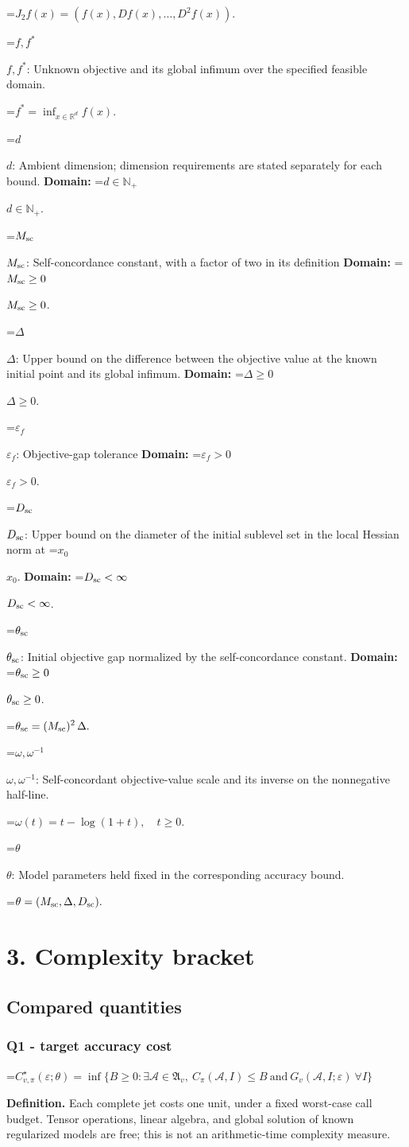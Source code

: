 \documentclass[10pt,a4paper]{article}
\newcommand{\AtlasMath}[1]{\par\begingroup\centering\setbox0=\hbox{$\displaystyle #1$}\ifdim\wd0>1.4\linewidth\typeout{ATLAS WIDE FORMULA: \the\wd0}\fi\ifdim\wd0>\linewidth\resizebox{\linewidth}{!}{\box0}\else\box0\fi\par\endgroup}
\newcommand{\AtlasInlineMath}[1]{\begingroup\setbox0=\hbox{$#1$}\ifdim\wd0>.4\linewidth\endgroup\AtlasMath{#1}\else\endgroup$#1$\fi}
\begin{document}
\AtlasMath{J_{2}f(x)=(f(x),Df(x),\ldots,D^{2}f(x)).}


\AtlasInlineMath{f,f^*}: Unknown objective and its global infimum over the specified feasible domain.


\AtlasMath{f^*=\inf_{x\in \mathbb{R}^d}f(x).}


\AtlasInlineMath{d}: Ambient dimension; dimension requirements are stated separately for each bound. \textbf{Domain:} \AtlasInlineMath{d\in\mathbb{N}_{+}}.

\AtlasInlineMath{M_{\rm sc}}: Self-concordance constant, with a factor of two in its definition \textbf{Domain:} \AtlasInlineMath{M_{\rm sc}\ge0}.

\AtlasInlineMath{\Delta}: Upper bound on the difference between the objective value at the known initial point and its global infimum. \textbf{Domain:} \AtlasInlineMath{\Delta\ge0}.

\AtlasInlineMath{\varepsilon_f}: Objective-gap tolerance \textbf{Domain:} \AtlasInlineMath{\varepsilon_f>0}.

\AtlasInlineMath{D_{\rm sc}}: Upper bound on the diameter of the initial sublevel set in the local Hessian norm at \AtlasInlineMath{x_0}. \textbf{Domain:} \AtlasInlineMath{D_{\rm sc}<\infty}.

\AtlasInlineMath{\theta_{\rm sc}}: Initial objective gap normalized by the self-concordance constant. \textbf{Domain:} \AtlasInlineMath{\theta_{\rm sc}\ge0}.


\AtlasMath{\theta_{\rm sc}=(M_{\rm sc})^{2}\,\Delta.}


\AtlasInlineMath{\omega,\omega^{-1}}: Self-concordant objective-value scale and its inverse on the nonnegative half-line.


\AtlasMath{\omega(t)=t-\log(1+t),\quad t\ge0.}


\AtlasInlineMath{\theta}: Model parameters held fixed in the corresponding accuracy bound.


\AtlasMath{\theta=(M_{\rm sc},\Delta,D_{\rm sc}).}


\section{3. Complexity bracket}
\subsection{Compared quantities}
\subsubsection{Q1 - target accuracy cost}
\AtlasMath{C^\star_{v,\pi}(\varepsilon;\theta)=\inf\{B\ge0:\exists\mathcal A\in\mathfrak A_v,\ C_\pi(\mathcal A,I)\le B\ \text{and}\ G_v(\mathcal A,I;\varepsilon)\ \forall I\}}
\textbf{Definition.} Each complete jet costs one unit, under a fixed worst-case call budget. Tensor operations, linear algebra, and global solution of known regularized models are free; this is not an arithmetic-time complexity measure.
\end{document}
